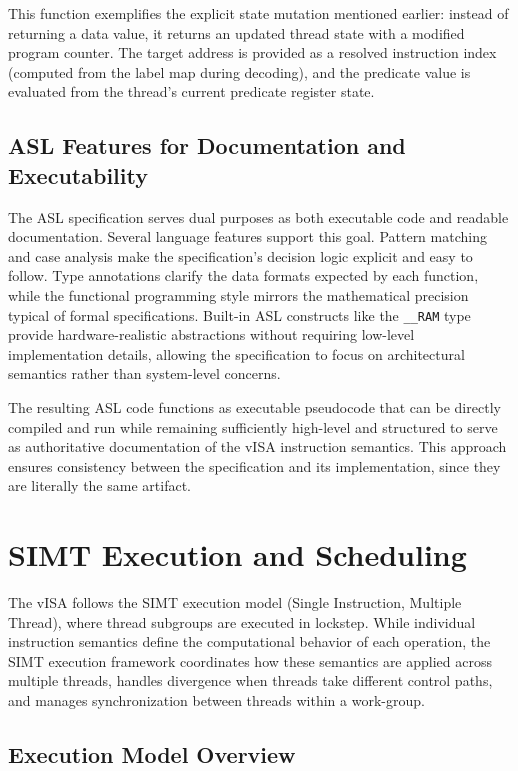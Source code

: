 This function exemplifies the explicit state mutation mentioned earlier:
instead of returning a data value, it returns an updated thread state with a
modified program counter. The target address is provided as a resolved
instruction index (computed from the label map during decoding), and the
predicate value is evaluated from the thread's current predicate register
state.

\subsection{ASL Features for Documentation and Executability}

The ASL specification serves dual purposes as both executable code and readable
documentation. Several language features support this goal. Pattern matching
and case analysis make the specification's decision logic explicit and easy to
follow. Type annotations clarify the data formats expected by each function,
while the functional programming style mirrors the mathematical precision
typical of formal specifications. Built-in ASL constructs like the
\lstinline{__RAM} type provide hardware-realistic abstractions without
requiring low-level implementation details, allowing the specification to focus
on architectural semantics rather than system-level concerns.

The resulting ASL code functions as executable pseudocode that can be directly
compiled and run while remaining sufficiently high-level and structured to
serve as authoritative documentation of the vISA instruction semantics. This
approach ensures consistency between the specification and its implementation,
since they are literally the same artifact.

\section{SIMT Execution and Scheduling}

The vISA follows the SIMT execution model (Single Instruction, Multiple
Thread), where thread subgroups are executed in lockstep. While individual
instruction semantics define the computational behavior of each operation, the
SIMT execution framework coordinates how these semantics are applied across
multiple threads, handles divergence when threads take different control paths,
and manages synchronization between threads within a work-group.

\subsection{Execution Model Overview}

